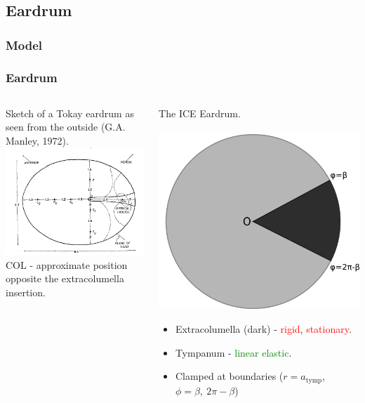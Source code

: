 \documentclass{beamer}
\begin{document}
\subsection{Eardrum}
\subsubsection{Model}
\begin{frame}[t]
\frametitle{Eardrum}
\begin{columns}
    \begin{column}{0.5\textwidth}
      \centering
      \small
      Sketch of a Tokay eardrum as seen from the outside (G.A. Manley, 1972).\\
      \includegraphics[width = 3.7 cm]{Diagrams/geckoear.png}\\
      \small
     COL - approximate position opposite the extracolumella insertion.
    \end{column}

    \begin{column}{0.5\textwidth}
      \centering
      \small
      The ICE Eardrum.\\
      \textbf{}\\
      \includegraphics[width = 3.2 cm]{Diagrams/tympanummodel.png}\\
\small
\begin{itemize}
      \item[] Extracolumella (dark) - \textcolor{red}{rigid}, \textcolor{red}{stationary}.
      \item[] Tympanum - \textcolor{green}{linear elastic}.
      \item[] Clamped at boundaries ($r=a_{\mathrm{tymp}}$, $\phi=\beta,\ 2\pi-\beta$)
\end{itemize}

    \end{column}
  \end{columns}
  
\end{frame}
\end{document}
